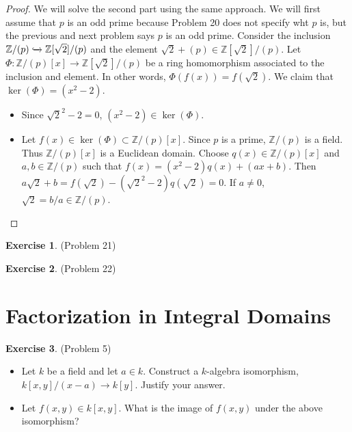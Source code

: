 \documentclass[12pt, psamsfonts]{amsart}
\theoremstyle{definition}
\newtheorem*{exer}{Exercise}
\theoremstyle{remark}
\numberwithin{equation}{section}
\begin{document}
\begin{proof}
  We will solve the second part using the same approach.
  We will first assume that $p$ is an odd prime because Problem 20 does not specify wht $p$ is, but the previous and next problem says $p$ is an odd prime.
  Consider the inclusion $\mathbb{Z}/(p) \xhookrightarrow{} \mathbb{Z}[\sqrt{2}]/(p)$ and the element $\sqrt{2} + (p) \in \mathbb{Z}[\sqrt{2}]/(p)$.
  Let $\Phi: \mathbb{Z}/(p)[x] \rightarrow \mathbb{Z}[\sqrt{2}]/(p)$ be a ring homomorphism associated to the inclusion and element.
  In other words, $\Phi(f(x)) = f(\sqrt{2})$.
  We claim that $\ker(\Phi) = (x^2 - 2)$.
  \begin{itemize}
    \item
      Since $\sqrt{2}^2 - 2 = 0$, $(x^2 - 2) \in \ker(\Phi)$.
    \item
      Let $f(x) \in \ker(\Phi) \subset \mathbb{Z}/(p)[x]$.
      Since $p$ is a prime, $\mathbb{Z}/(p)$ is a field.
      Thus $\mathbb{Z}/(p)[x]$ is a Euclidean domain.
      Choose $q(x) \in \mathbb{Z}/(p)[x]$ and $a, b \in \mathbb{Z}/(p)$ such that $f(x) = (x^2 - 2)q(x) + (ax + b)$.
      Then $a\sqrt{2} + b = f(\sqrt{2}) - (\sqrt{2}^2 - 2)q(\sqrt{2}) = 0$.
      If $a \ne 0$, $\sqrt{2} = b/a \in \mathbb{Z}/(p)$.
  \end{itemize}
\end{proof}

\begin{exer}{(Problem 21)}
  \todo[inline]{
  }
\end{exer}

\begin{exer}{(Problem 22)}
  \todo[inline]{
  }
\end{exer}

\section{Factorization in Integral Domains}

\begin{exer}{(Problem 5)}
  $ $
  \begin{itemize}
    \item
      Let $k$ be a field and let $a \in k$.
      Construct a $k$-algebra isomorphism, $k[x, y] / (x - a) \rightarrow k[y]$.
      Justify your answer.
    \item
      Let $f(x, y) \in k[x, y]$.
      What is the image of $f(x, y)$ under the above isomorphism?
  \end{itemize}
\end{exer}
\end{document}
